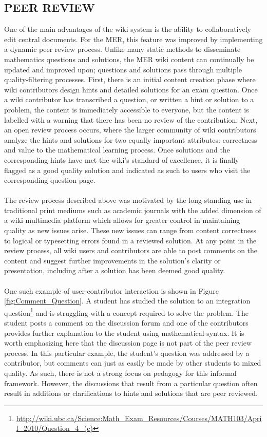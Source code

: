 \documentclass{primus}
\begin{document}
\subsection{PEER REVIEW}\label{sec:Peer_Review}
One of the main advantages of the wiki system is the ability to collaboratively edit central documents. For the MER, this feature was improved by implementing a dynamic peer review process. Unlike many static methods to disseminate mathematics questions and solutions, the MER wiki content can continually be updated and improved upon; questions and solutions pass through multiple quality-filtering processes. First, there is an initial content creation phase where wiki contributors design hints and detailed solutions for an exam question. Once a wiki contributor has transcribed a question, or written a hint or solution to a problem, the content is immediately accessible to everyone, but the content is labelled with a warning that there has been no review of the contribution. Next, an open review process occurs, where the larger community of wiki contributors analyze the hints and solutions for two equally important attributes: correctness and value to the mathematical learning process. Once solutions and the corresponding hints have met the wiki’s standard of excellence, it is finally flagged as a good quality solution and indicated as such to users who visit the corresponding question page.
\\\\
\noindent{}The review process described above was motivated by the long standing use in traditional print mediums such as academic journals with the added dimension of a wiki multimedia platform which allows for greater control in maintaining quality as new issues arise. These new issues can range from content correctness to logical or typesetting errors found in a reviewed solution. At any point in the review process, all wiki users and contributors are able to post comments on the content and suggest further improvements in the solution’s clarity or presentation, including after a solution has been deemed good quality.
\\\\
\noindent{}One such example of user-contributor interaction is shown in Figure \ref{fig:Comment_Question}. A student has studied the solution to an integration question\footnote{\label{ft:question}\url{http://wiki.ubc.ca/Science:Math_Exam_Resources/Courses/MATH103/April_2010/Question_4_(c)}} and is struggling with  a concept required to solve the problem. The student posts a comment on the discussion forum and one of the contributors provides further explanation to the student using mathematical syntax. It is worth emphasizing here that the discussion page is not part of the peer review process.  In this particular example, the student’s question was addressed by a contributor, but comments can just as easily be made by other students to mixed quality.  As such, there is not a strong focus on pedagogy for this informal framework.  However, the discussions that result from a particular question often result in additions or clarifications to hints and solutions that are peer reviewed.
\end{document}
